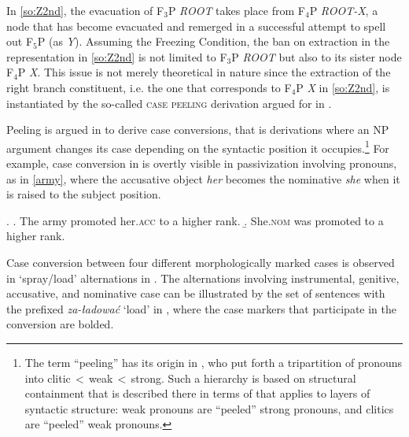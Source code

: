  In \ref{so:Z2nd}, the evacuation of F$_{3}$P \textit{ROOT} takes place from F$_{4}$P \textit{ROOT-X}, a node that has become evacuated and remerged in a successful attempt to spell out F$_{5}$P (as \textit{Y}). 
Assuming the Freezing Condition, the ban on extraction in the representation in \ref{so:Z2nd} is not limited to F$_{3}$P \textit{ROOT} but also to its sister node F$_{4}$P \textit{X}. This issue is not merely theoretical in nature since the extraction of the right branch constituent, i.e. the one that corresponds to F$_{4}$P \textit{X} in \ref{so:Z2nd}, is instantiated by the so-called \textsc{case peeling}  derivation argued for in \citet[\S4]{Caha2009}.
\par
Peeling is argued in \citet[\S4]{Caha2009} to derive case conversions, that is derivations where an NP argument changes its case depending on the syntactic position it occupies.\footnote{The term ``peeling'' has its origin in \citet[195]{Cardinaletti-Starke1999}, who put forth a tripartition of pronouns into clitic\,$<$\,weak\,$<$\,strong. Such a hierarchy is based on structural containment that is described there in terms of  that applies to layers of syntactic structure: weak pronouns are ``peeled'' strong pronouns, and clitics are ``peeled'' weak pronouns. 
} %
 For example, case conversion in  is overtly visible in passivization involving pronouns, as in \ref{army}, where the accusative object \textit{her} becomes the nominative \textit{she} when it is raised to the subject position.

\ex.\label{army} 
\a. The army promoted her.\textsc{acc} to a higher rank.
\b. She.\textsc{nom} was promoted to a higher rank.

Case conversion between four different morphologically marked cases is observed in `spray/load' alternations in . The alternations involving instrumental, genitive, accusative, and nominative case can be illustrated by the set of sentences with the  prefixed  \textit{za-\l{}adowa\'c} `load' in \Next, where the case markers that participate in the conversion are bolded. 

